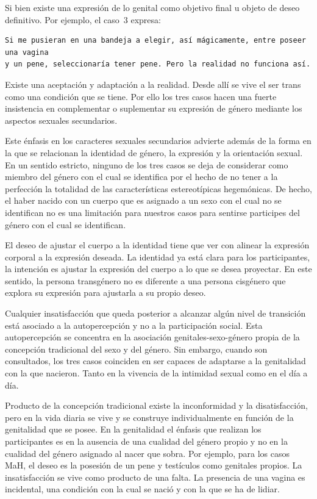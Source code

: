 Si bien existe una expresión de lo genital como objetivo final u objeto de deseo
definitivo. Por ejemplo, el caso~3 expresa:

\begin{verbatim}
Si me pusieran en una bandeja a elegir, así mágicamente, entre poseer una vagina
y un pene, seleccionaría tener pene. Pero la realidad no funciona así.
\end{verbatim}

Existe una aceptación y adaptación a la realidad. Desde allí se vive el ser
trans como una condición que se tiene. Por ello los tres casos hacen una fuerte
insistencia en complementar o suplementar su expresión de género mediante los
aspectos sexuales secundarios.

Este énfasis en los caracteres sexuales secundarios advierte además de la forma
en la que se relacionan la identidad de género, la expresión y la orientación
sexual. En un sentido estricto, ninguno de los tres casos se deja de considerar
como miembro del género con el cual se identifica por el hecho de no tener a la
perfección la totalidad de las características estereotípicas hegemónicas. De
hecho, el haber nacido con un cuerpo que es asignado a un sexo con el cual no se
identifican no es una limitación para nuestros casos para sentirse participes
del género con el cual se identifican.

El deseo de ajustar el cuerpo a la identidad tiene que ver con alinear la
expresión corporal a la expresión deseada. La identidad ya está clara para los
participantes, la intención es ajustar la expresión del cuerpo a lo que se desea
proyectar. En este sentido, la persona transgénero no es diferente a una persona
cisgénero que explora su expresión para ajustarla a su propio deseo.

 Cualquier insatisfacción que queda posterior a alcanzar algún nivel de
 transición está asociado a la autopercepción y no a la participación social.
 Esta autopercepción se concentra en la asociación genitales-sexo-género propia
 de la concepción tradicional del sexo y del género. Sin embargo, cuando son
 consultados, los tres casos coinciden en ser capaces de adaptarse a la
 genitalidad con la que nacieron. Tanto en la vivencia de la intimidad sexual
 como en el día a día.

 Producto de la concepción tradicional existe la inconformidad y la
 disatisfacción, pero en la vida diaria se vive y se construye individualmente
 en función de la genitalidad que se posee. En la genitalidad el énfasis que
 realizan los participantes es en la ausencia de una cualidad del género propio
 y no en la cualidad del género asignado al nacer que sobra. Por ejemplo, para
 los casos MaH, el deseo es la posesión de un pene y testículos como genitales
 propios. La insatisfacción se vive como producto de una falta. La presencia de
 una vagina es incidental, una condición con la cual se nació y con la que se ha
 de lidiar.

